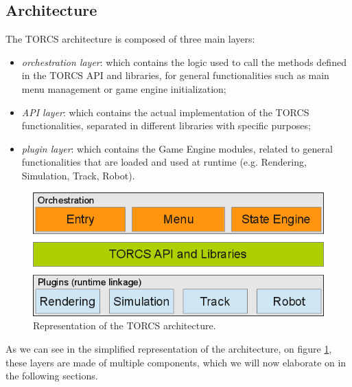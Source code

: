 \subsection{Architecture}
The TORCS architecture is composed of three main layers:
\begin{itemize}
	\item \textit{orchestration layer}: which contains the logic used to call the methods defined in the TORCS API and libraries, for general functionalities such as main menu management or game engine initialization;
	\item \textit{API layer}: which contains the actual implementation of the TORCS functionalities, separated in different libraries with specific purposes;
	\item \textit{plugin layer}: which contains the Game Engine modules, related to general functionalities that are loaded and used at runtime (e.g. Rendering, Simulation, Track, Robot).
\end{itemize}
\begin{figure}[h!]
	\centering
	\includegraphics[width=0.8\linewidth]{"immagini/Feasibility study/TORCS architecture"}
	\caption[Representation of the TORCS architecture.]{Representation of the TORCS architecture.}
	\label{fig:torcs-architecture}
\end{figure}
As we can see in the simplified representation of the architecture, on figure \ref{fig:torcs-architecture}, these layers are made of multiple components, which we will now elaborate on in the following sections.

